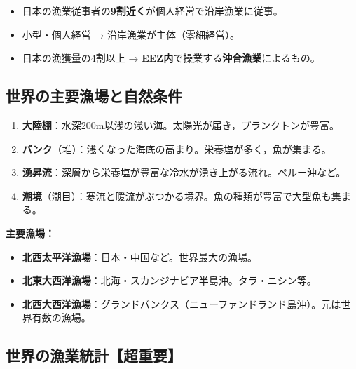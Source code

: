 \documentclass[a4paper,11pt]{article}
\newcommand{\imp}[1]{\textbf{\textcolor{mainred}{#1}}}
\newcommand{\key}[1]{\textbf{\textcolor{mainblue}{#1}}}
\begin{document}
\begin{tcolorbox}[pointbox, title={🔑 漁業別の日本の従事者割合}]
\begin{itemize}[leftmargin=1em]
  \item 日本の漁業従事者の\imp{9割近く}が個人経営で沿岸漁業に従事。
  \item 小型・個人経営 → 沿岸漁業が主体（零細経営）。
  \item 日本の漁獲量の4割以上 → \imp{EEZ内}で操業する\imp{沖合漁業}によるもの。
\end{itemize}
\end{tcolorbox}

\vspace{2mm}

\subsection{世界の主要漁場と自然条件}

\begin{tcolorbox}[pointbox, title={漁場の4条件（超重要）}]
\begin{enumerate}[leftmargin=1.5em]
  \item \key{大陸棚}：水深200m以浅の浅い海。太陽光が届き，プランクトンが豊富。
  \item \key{バンク}（堆）：浅くなった海底の高まり。栄養塩が多く，魚が集まる。
  \item \key{湧昇流}：深層から栄養塩が豊富な冷水が湧き上がる流れ。ペルー沖など。
  \item \key{潮境}（潮目）：寒流と暖流がぶつかる境界。魚の種類が豊富で大型魚も集まる。
\end{enumerate}

\medskip
\textbf{主要漁場：}
\begin{itemize}[leftmargin=1em]
  \item \imp{北西太平洋漁場}：日本・中国など。世界最大の漁場。
  \item \imp{北東大西洋漁場}：北海・スカンジナビア半島沖。タラ・ニシン等。
  \item \imp{北西大西洋漁場}：グランドバンクス（ニューファンドランド島沖）。元は世界有数の漁場。
\end{itemize}
\end{tcolorbox}

\vspace{2mm}

\subsection{世界の漁業統計【超重要】}
\end{document}
